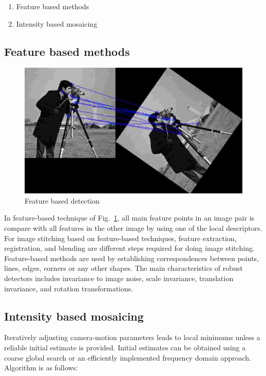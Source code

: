 \begin{enumerate}
	\item Feature based methods
	\item Intensity based mosaicing
\end{enumerate}


\subsection{Feature based methods}

\begin{figure}[t]
	\includegraphics[width=0.9\linewidth]{extra-5}
	\centering
	\caption{\label{fig: extra-5}Feature based detection~\cite{FeatureD37:online}}
\end{figure}

In feature-based technique of Fig.~\ref{fig: extra-5}, all main feature points in an image pair is compare with all features in the other image by using one of the local descriptors. For image stitching based on feature-based techniques, feature extraction, registration, and blending are different steps required for doing image stitching. Feature-based methods are used by establishing correspondences between points, lines, edges, corners or any other shapes. The main characteristics of robust detectors includes invariance to image noise, scale invariance, translation invariance, and rotation transformations.

\subsection{Intensity based mosaicing}
Iteratively adjusting camera-motion parameters leads to local minimums unless a reliable initial estimate is provided. Initial estimates can be obtained using a coarse global search or an efficiently implemented frequency domain approach. Algorithm is as follows:

